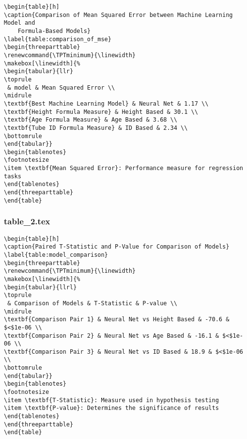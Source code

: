 \documentclass[11pt]{article}
\begin{document}
\begin{Verbatim}[tabsize=4]
\begin{table}[h]
\caption{Comparison of Mean Squared Error between Machine Learning Model and
	Formula-Based Models}
\label{table:comparison_of_mse}
\begin{threeparttable}
\renewcommand{\TPTminimum}{\linewidth}
\makebox[\linewidth]{%
\begin{tabular}{llr}
\toprule
 & model & Mean Squared Error \\
\midrule
\textbf{Best Machine Learning Model} & Neural Net & 1.17 \\
\textbf{Height Formula Measure} & Height Based & 30.1 \\
\textbf{Age Formula Measure} & Age Based & 3.68 \\
\textbf{Tube ID Formula Measure} & ID Based & 2.34 \\
\bottomrule
\end{tabular}}
\begin{tablenotes}
\footnotesize
\item \textbf{Mean Squared Error}: Performance measure for regression tasks
\end{tablenotes}
\end{threeparttable}
\end{table}

\end{Verbatim}

\subsubsection*{table\_2.tex}

\begin{Verbatim}[tabsize=4]
\begin{table}[h]
\caption{Paired T-Statistic and P-Value for Comparison of Models}
\label{table:model_comparison}
\begin{threeparttable}
\renewcommand{\TPTminimum}{\linewidth}
\makebox[\linewidth]{%
\begin{tabular}{llrl}
\toprule
 & Comparison of Models & T-Statistic & P-value \\
\midrule
\textbf{Comparison Pair 1} & Neural Net vs Height Based & -70.6 & $<$1e-06 \\
\textbf{Comparison Pair 2} & Neural Net vs Age Based & -16.1 & $<$1e-06 \\
\textbf{Comparison Pair 3} & Neural Net vs ID Based & 18.9 & $<$1e-06 \\
\bottomrule
\end{tabular}}
\begin{tablenotes}
\footnotesize
\item \textbf{T-Statistic}: Measure used in hypothesis testing
\item \textbf{P-value}: Determines the significance of results
\end{tablenotes}
\end{threeparttable}
\end{table}

\end{Verbatim}




\end{document}
